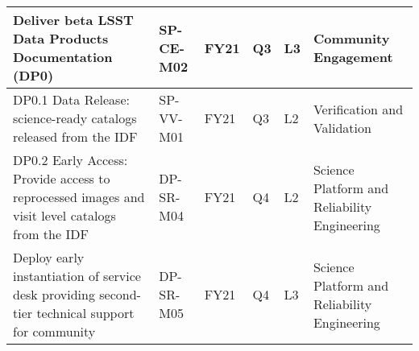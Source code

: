 \begin{longtable} {|p{}|l|l|l|l|l|}
{Deliver beta LSST Data Products Documentation (DP0)}&{SP-CE-M02}&{FY21}&{Q3}&{L3}&{Community Engagement} \\ \hline
{DP0.1 Data Release: science-ready catalogs released from the IDF}&{SP-VV-M01}&{FY21}&{Q3}&{L2}&{Verification and Validation} \\ \hline
{DP0.2 Early Access: Provide access to reprocessed images and visit level catalogs from the IDF}&{DP-SR-M04}&{FY21}&{Q4}&{L2}&{Science Platform and Reliability Engineering} \\ \hline
{Deploy early instantiation of service desk providing second-tier technical support for community}&{DP-SR-M05}&{FY21}&{Q4}&{L3}&{Science Platform and Reliability Engineering} \\ \hline
\end{longtable} \normalsize
